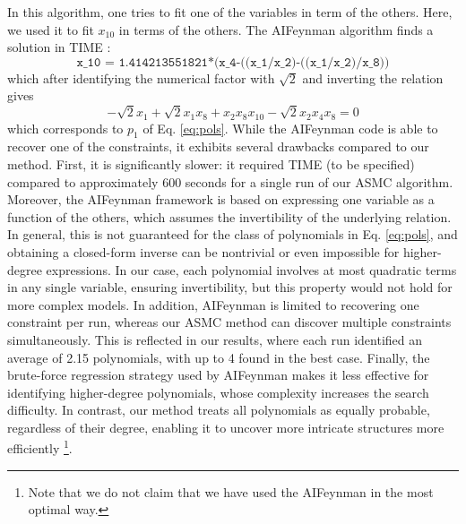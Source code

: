 \documentclass[11pt]{article}
\begin{document}
In this algorithm, one tries to fit one of the variables in term of the others. Here, we used it to fit $x_{10}$ in terms of the others. The AIFeynman algorithm finds a solution in TIME : 
\begin{equation}
	\texttt{x\_10 = 1.414213551821*(x\_4-((x\_1/x\_2)-((x\_1/x\_2)/x\_8))}
\end{equation}
which after identifying the numerical factor with $\sqrt 2$ and inverting the relation gives 
\begin{equation}
	- \sqrt 2 x_1 + \sqrt 2 x_1 x_8 + x_2 x_8  x_{10} -\sqrt 2 x_2 x_4 x_8 = 0
\end{equation}
which corresponds to $p_1$ of Eq. \eqref{eq:pols}. While the AIFeynman code is able to recover one of the constraints, it exhibits several drawbacks compared to our method. First, it is significantly slower: it required TIME (to be specified) compared to approximately 600 seconds for a single run of our ASMC algorithm. Moreover, the AIFeynman framework is based on expressing one variable as a function of the others, which assumes the invertibility of the underlying relation. In general, this is not guaranteed for the class of polynomials in Eq. \eqref{eq:pols}, and obtaining a closed-form inverse can be nontrivial or even impossible for higher-degree expressions. In our case, each polynomial involves at most quadratic terms in any single variable, ensuring invertibility, but this property would not hold for more complex models. In addition, AIFeynman is limited to recovering one constraint per run, whereas our ASMC method can discover multiple constraints simultaneously. This is reflected in our results, where each run identified an average of 2.15 polynomials, with up to 4 found in the best case. Finally, the brute-force regression strategy used by AIFeynman makes it less effective for identifying higher-degree polynomials, whose complexity increases the search difficulty. In contrast, our method treats all polynomials as equally probable, regardless of their degree, enabling it to uncover more intricate structures more efficiently \footnote{Note that we do not claim that we have used the AIFeynman in the most optimal way.}.
\end{document}
